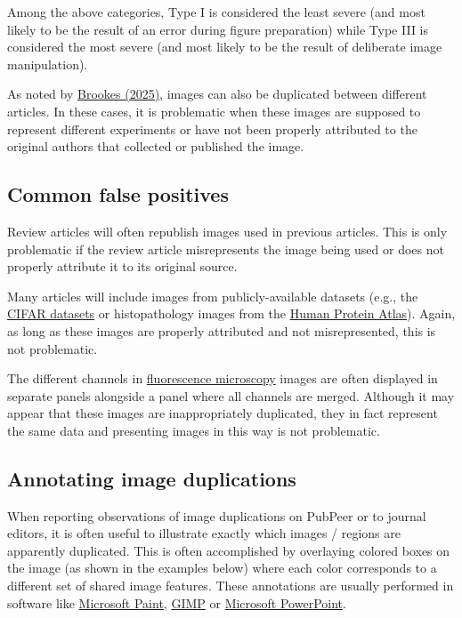 \documentclass[letterpaper, 12pt]{article}
\begin{document}
Among the above categories, Type I is considered the least severe (and most likely to be the result of an error during figure preparation) while Type III is considered the most severe (and most likely to be the result of deliberate image manipulation). 

As noted by \href{https://doi.org/10.1017/jme.2025.32}{Brookes (2025)}, images can also be duplicated between different articles. In these cases, it is problematic when these images are supposed to represent different experiments or have not been properly attributed to the original authors that collected or published the image.

\subsection*{Common false positives}

Review articles will often republish images used in previous articles. This is only problematic if the review article misrepresents the image being used or does not properly attribute it to its original source.

Many articles will include images from publicly-available datasets (e.g., the \href{https://www.cs.toronto.edu/~kriz/cifar.html}{CIFAR datasets} or histopathology images from the \href{https://www.proteinatlas.org/}{Human Protein Atlas}). Again, as long as these images are properly attributed and not misrepresented, this is not problematic.

The different channels in \href{https://en.wikipedia.org/wiki/Fluorescence_microscope}{fluorescence microscopy} images are often displayed in separate panels alongside a panel where all channels are merged. Although it may appear that these images are inappropriately duplicated, they in fact represent the same data and presenting images in this way is not problematic.

\subsection*{Annotating image duplications}

When reporting observations of image duplications on PubPeer or to journal editors, it is often useful to illustrate exactly which images / regions are apparently duplicated. This is often accomplished by overlaying colored boxes on the image (as shown in the examples below) where each color corresponds to a different set of shared image features. These annotations are usually performed in software like \href{https://www.microsoft.com/en-us/windows/paint}{Microsoft Paint}, \href{https://www.gimp.org/}{GIMP} or \href{https://www.microsoft.com/en-us/microsoft-365/powerpoint}{Microsoft PowerPoint}. 
\end{document}
